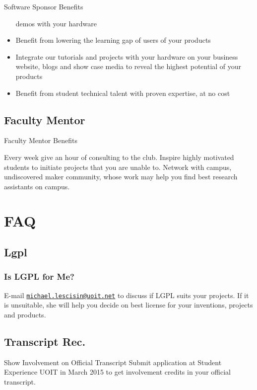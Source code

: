 \documentclass{beamer}
\begin{document}
\begin{frame}{Software Sponsor Benefits}
\begin{itemize}
demos with your hardware
\item Benefit from lowering the learning gap of users of your products
\item Integrate our tutorials and projects with your hardware on your business website, blogs and show case media to reveal the highest potential of your products
\item Benefit from student technical talent with proven expertise, at no cost
\end{itemize}
\end{frame}

\subsection{Faculty Mentor}

\begin{frame}{Faculty Mentor Benefits}

Every week give an hour of consulting to the club. Inspire highly motivated students to initiate projects that you are unable to. Network with campus, undiscovered maker community, whose work may help you find best research assistants on campus.

\end{frame}

\section{FAQ}

\subsection{Lgpl}

\begin{frame}[label={LGPL}]
\frametitle{Is LGPL for Me?}

E-mail \texttt{\href{mailto:michael.lescisin@uoit.net}{michael.lescisin@uoit.net}} to discuss if LGPL suits your projects. If it is unsuitable, she will help you decide on best license for your inventions, projects and products.

\end{frame}

\subsection{Transcript Rec.}

\begin{frame}{Show Involvement on Official Transcript}
Submit application at Student Experience UOIT in March 2015 to get involvement credits in your official transcript.
\end{frame}
\end{document}

